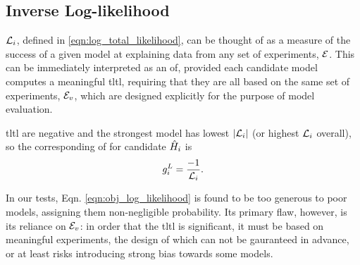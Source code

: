 \begin{table}    
    \caption[Objective function examples]{
        Examples of how each objective function, $g$ as described in \cref{sec:inverse_ll} to \cref{sec:elo},
            assign selection probability (denoted \%) to the same set of candidate models, $\{\hi\}$ listed in \cref{eqn:obj_fnc_eg_models}, 
            when attempting to learn data from $\ho$. 
        Intermediate quantities, e.g. $w_i^A$, $g_i^p$ are described in the section of the main text describing the corresponding \gls{of}.
        For each model we first summarise its
            $\fs$ (\cref{eqn:f1_score}),
            number of terms $k$,
            median  \gls{likelihood} $\overline{l_e}$ (\cref{eqn:log_likelihood}),     
            and \gls{tltl} $\tll_{i}$ (\cref{eqn:log_total_likelihood}), 
        We use $n=250$ samples, i.e. $\tll_{i}$ is a sum of $n$ \glspl{likelihood} .  
        The set of models is truncated so that only the strongest four are assigned selection probability. 
    }
    \label{table:objective_functions}
\end{table}

\subsection{Inverse Log-likelihood}\label{sec:inverse_ll}
$\tll_{i}$, defined in \cref{eqn:log_total_likelihood}, can be thought of as a measure of the success of a given model at explaining data from any set of experiments, ${ \mathcal{E} }$. 
This can be immediately interpreted as an \gls{of}, provided each candidate model 
    computes a meaningful \gls{tltl}, requiring that they are all based on the same set of experiments, ${ \mathcal{E} }_v$,
    which are designed explicitly for the purpose of model evaluation. 
\par 

\gls{tltl} are negative and the strongest model has lowest $\lvert {\mathcal{L}}_{i} \rvert$ (or highest $\tll_{i}$ overall),
    so the corresponding \gls{of} for candidate $\hat{H}_i$ is 
\begin{equation}
    \label{eqn:obj_log_likelihood}
    g_i^{L} = \frac{-1}{{\mathcal{L}}_{i}}.
\end{equation}

In our tests, Eqn. \ref{eqn:obj_log_likelihood} is found to be too generous to poor models, 
    assigning them non-negligible probability. 
Its primary flaw, however, is its reliance on ${ \mathcal{E} }_v$: 
    in order that the \gls{tltl} is significant, it must be based on meaningful experiments, 
    the design of which can not be gauranteed in advance, or at least risks introducing strong bias
    towards some models. 

